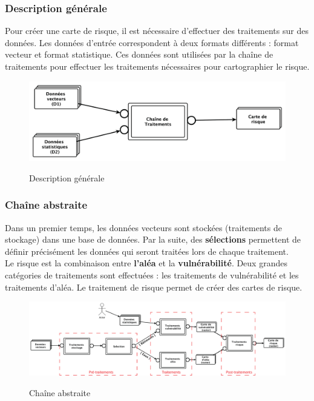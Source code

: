 \subsubsection{Description générale}

Pour créer une carte de risque, il est nécessaire d'effectuer des traitements sur des données. Les données d'entrée correspondent à deux formats différents : format vecteur et format statistique. Ces données sont utilisées par la chaîne de traitements pour effectuer les traitements nécessaires pour cartographier le risque.\\


\begin{figure}[H]
\begin{center}
\includegraphics[]{Traitement1.png}\\
\caption{\label{Traitement11} Description générale}

\end{center}
\end{figure}




\subsubsection{Chaîne abstraite}

Dans un premier temps, les données vecteurs sont stockées (traitements de stockage) dans une base de données. Par la suite, des \textbf{sélections} permettent de définir précisément les données qui seront traitées lors de chaque traitement.\\

Le risque est la combinaison entre \textbf{l'aléa} et la \textbf{ vulnérabilité}. Deux grandes catégories de traitements sont effectuées : les traitements de vulnérabilité et les traitements d'aléa. Le traitement de risque permet de créer des cartes de risque.\\


\begin{figure}[H]
\begin{center}

\includegraphics[width=15cm]{traitements2.png}\\
\caption{\label{Traitement12} Chaîne abstraite}
\end{center}
\end{figure}



